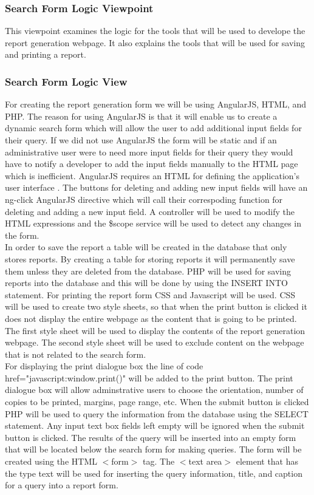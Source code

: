 \subsubsection{Search Form Logic Viewpoint}
This viewpoint examines the logic for the tools that will be used to develope the report generation webpage. It also explains the tools that will be used for saving and printing a report.  

\subsubsection{Search Form Logic View} 
For creating the report generation form we will be using AngularJS, HTML, and PHP. The reason for using AngularJS is that it will enable us to create a dynamic search form which will allow the user to add additional input fields for their query. If we did not use AngularJS the form will be static and if an administrative user were to need more input fields for their query they would have to notify a developer to add the input fields manually to the HTML page which is inefficient. AngularJS requires an HTML for defining the application's user interface \cite{Lau}. The buttons for deleting and adding new input fields will have an ng-click AngularJS directive which will call their correspoding function for deleting and adding a new input field.  A controller will be used to modify the HTML expressions and the \$scope service will be used to detect any changes in the form\cite{Rav}.\\ 

In order to save the report a table will be created in the database that only stores reports. By creating a table for storing reports it will permanently save them unless they are deleted from the database. PHP will be used for saving reports into the database and this will be done by using the INSERT INTO statement. For printing the report form CSS and Javascript will be used. CSS will be used to create two style sheets, so that when the print button is clicked it does not display the entire webpage as the content that is going to be printed. The first style sheet will be used to display the contents of the report generation webpage. The second style sheet will be used to exclude content on the webpage that is not related to the search form.\\

For displaying the print dialogue box the line of code href="javascript:window.print()" will be added to the print button. The print dialogue box will allow adminstrative users to choose the orientation, number of copies to be printed, margins, page range, etc. When the submit button is clicked PHP will be used to query the information from the database using the SELECT statement. Any input text box fields left empty will be ignored when the submit button is clicked. The results of the query will be inserted into an empty form that will be located below the search form for making queries. The form will be created using the HTML $<$form$>$ tag. The $<$text area$>$ element that has the type text will be used for inserting the query information, title, and caption for a query into a report form. 

